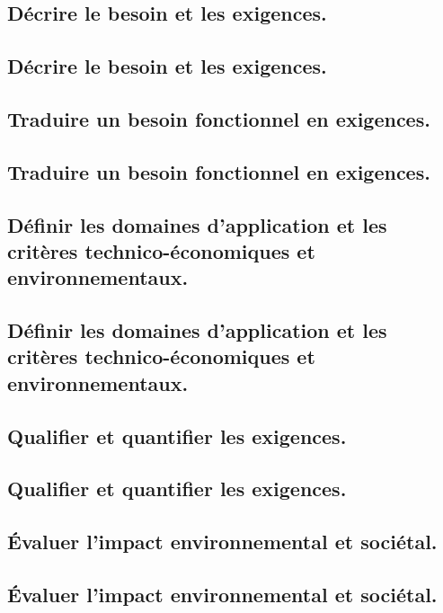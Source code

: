 \documentclass[10pt,fleqn]{book}
\begin{document}
\subsection{Décrire le besoin et les exigences.} 

\subsection{Décrire le besoin et les exigences.} 

\subsection{Traduire un besoin fonctionnel en exigences.} 

\subsection{Traduire un besoin fonctionnel en exigences.} 

\subsection{Définir les domaines d’application et les critères technico-économiques et environnementaux.} 

\subsection{Définir les domaines d’application et les critères technico-économiques et environnementaux.} 

\subsection{Qualifier et quantifier les exigences.} 

\subsection{Qualifier et quantifier les exigences.} 

\subsection{Évaluer l’impact environnemental et sociétal.} 

\subsection{Évaluer l’impact environnemental et sociétal.} 
\end{document}
